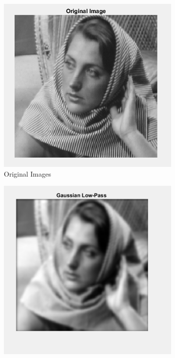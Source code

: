 \documentclass[a4paper]{article}
\begin{document}
\begin{figure}[h]
    \centering
    \begin{subfigure}{0.32\linewidth}
        \centering
        \includegraphics[width=\linewidth]{ori.png}
        \caption{Original Images}
    \end{subfigure}
    \begin{subfigure}{0.32\linewidth}
        \centering
        \includegraphics[width=\linewidth]{40_image.png}

\end{subfigure}
\end{figure}
\end{document}
